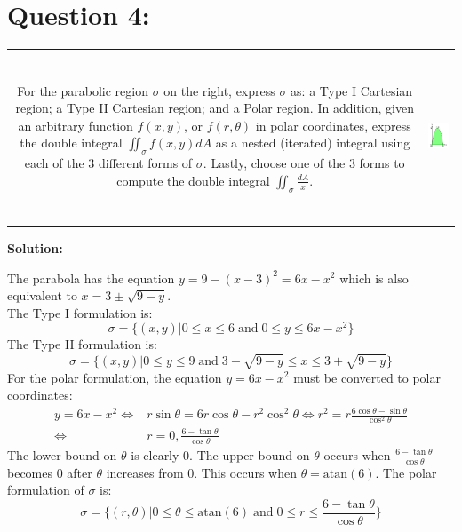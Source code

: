 \documentclass{article}
\newcommand{\atan}{\text{atan}}
\newcommand{\dr}[1]{\textcolor{dark_red}{#1}}
\begin{document}
\section*{Question 4:}

\begin{tabular}{cc}
\parbox{0.6\textwidth}{For the parabolic region \(\sigma\) on the right, express \(\sigma\) as: a Type I Cartesian region; a Type II Cartesian region; and a Polar region. In addition, given an arbitrary function \(f(x,y)\), or \(f(r,\theta)\) in polar coordinates, express the double integral \(\iint_{\sigma} f(x,y)dA\) as a nested (iterated) integral using each of the 3 different forms of \(\sigma\). Lastly, choose one of the 3 forms to compute the double integral \(\iint_{\sigma} \frac{dA}{x}\).}
& 
\parbox{0.4\textwidth}{\includegraphics[height = 5cm]{Test_bench_part_3_images/Test_bench_part_3_image_1}}
\end{tabular}

\vspace{5mm}
\dr{\textbf{Solution:}}

\dr{The parabola has the equation \(y = 9 - (x - 3)^2 = 6x - x^2\) which is also equivalent to \(x = 3 \pm \sqrt{9 - y}\). \\
The Type I formulation is:
\[\sigma = \{(x,y) | 0 \leq x \leq 6 \;\text{and}\; 0 \leq y \leq 6x - x^2\}\]
The Type II formulation is:
\[\sigma = \{(x,y) | 0 \leq y \leq 9 \;\text{and}\; 3 - \sqrt{9 - y} \leq x \leq 3 + \sqrt{9 - y}\}\]
For the polar formulation, the equation \(y = 6x - x^2\) must be converted to polar coordinates: 
\begin{align*}
y = 6x - x^2 \iff & r\sin\theta = 6r\cos\theta - r^2\cos^2\theta 
\iff r^2 = r\frac{6\cos\theta - \sin\theta}{\cos^2\theta} \\
\iff & r = 0, \frac{6 - \tan\theta}{\cos\theta}
\end{align*}
The lower bound on \(\theta\) is clearly \(0\). The upper bound on \(\theta\) occurs when \(\frac{6 - \tan\theta}{\cos\theta}\) becomes \(0\) after \(\theta\) increases from \(0\). This occurs when \(\theta = \atan(6)\). The polar formulation of \(\sigma\) is:
\[\sigma = \{(r,\theta) | 0 \leq \theta \leq \atan(6) \;\text{and}\; 0 \leq r \leq \frac{6 - \tan\theta}{\cos\theta}\}\] 
}
\end{document}
